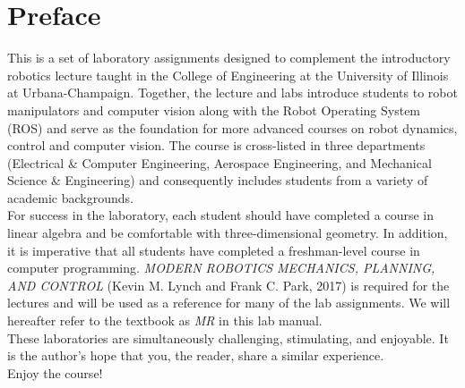 \documentclass[oneside]{book}
\begin{document}

\tableofcontents


\chapter*{Preface}
This is a set of laboratory assignments designed to complement the introductory robotics lecture taught in the College of Engineering at the University of Illinois at Urbana-Champaign.  Together, the lecture and labs introduce students to robot manipulators and computer vision along with the Robot Operating System (ROS) and serve as the foundation for more advanced courses on robot dynamics, control and computer vision.  The course is cross-listed in three departments (Electrical \& Computer Engineering, Aerospace Engineering, and Mechanical Science \& Engineering) and consequently includes students from a variety of academic backgrounds. \\

For success in the laboratory, each student should have completed a course in linear algebra and be comfortable with three-dimensional geometry.  In addition, it is imperative that all students have completed a freshman-level course in computer programming.  \textit{MODERN ROBOTICS
MECHANICS, PLANNING, AND CONTROL} (Kevin M. Lynch and Frank C. Park, 2017) is required for the lectures and will be used as a reference for many of the lab assignments.  We will hereafter refer to the textbook as \textit{MR} in this lab manual. \\

These laboratories are simultaneously challenging, stimulating, and enjoyable.  It is the author's hope that you, the reader, share a similar experience.\\

Enjoy the course! 
\thispagestyle{empty}

\mainmatter









\appendix

% 


\end{document}
